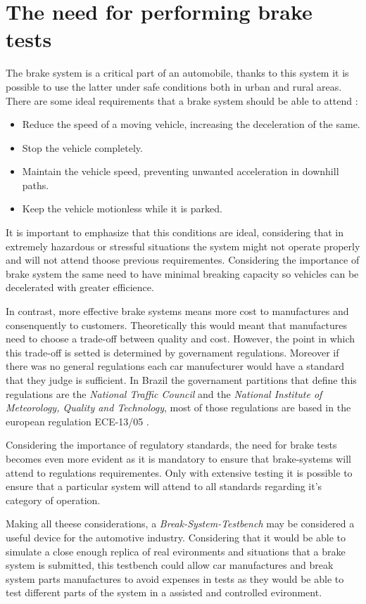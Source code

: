 \section{The need for performing brake tests}
		The brake system is a critical part of an automobile, thanks to this system it is possible to use the latter under safe conditions both in urban and rural areas. There are some ideal requirements that a brake system should be able to attend \cite{kawaguchi} :

		\begin{itemize}
			\item Reduce the speed of a moving vehicle, increasing the deceleration of the same.
			\item Stop the vehicle completely.
			\item Maintain the vehicle speed, preventing unwanted acceleration in downhill paths.
			\item Keep the vehicle motionless while it is parked.
		\end{itemize}

		It is important to emphasize that this conditions are ideal, considering that in extremely hazardous or stressful situations the system might not operate properly and will not attend thoose previous requirementes. Considering the importance of brake system the same need to have minimal breaking capacity so vehicles can be decelerated with greater efficience. 
		\par
		In contrast, more effective brake systems means more cost to manufactures and consenquently to customers. Theoretically this would meant that manufactures need to choose a trade-off between quality and cost. However, the point in which this trade-off is setted is determined by governament regulations. Moreover if there was no general regulations each car manufecturer would have a standard that they judge is sufficient. In Brazil the governament partitions that define this regulations are the \textit{National Traffic Council} and the \textit{National Institute of Meteorology, Quality and Technology}, most of those regulations are based in the european regulation ECE-13/05 \cite{inmetro2013} .
		\par
		Considering the importance of regulatory standards, the need for brake tests becomes even more evident as it is mandatory to ensure that brake-systems will attend to regulations requirementes. Only with extensive testing it is possible to ensure that a particular system will attend to all standards regarding it's category of operation. 
		\par
		Making all theese considerations, a \textit{Break-System-Testbench} may be considered a useful device for the automotive industry. Considering that it would be able to simulate a close enough replica of real evironments and situations that a brake system is submitted, this testbench could allow car manufactures and break system parts manufactures to avoid expenses in tests as they would be able to test different parts of the system in a assisted and controlled evironment.
